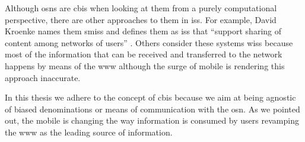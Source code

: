Although \acp{osn} are \ac{cbis} when looking at them from a purely computational 
perspective, there are other approaches to them in \acp{is}. For example, David 
Kroenke names them \acp{smis} and defines them as \acp{is} that ``support sharing 
of content among networks of users'' \cite{Kroenke15}. Others consider these systems 
\acp{wis} because most of the information that can be received and transferred to 
the network happens by means of the \ac{www} although the surge of mobile \Internet 
is rendering this approach inaccurate.

In this thesis we adhere to the concept of \ac{cbis} because we aim at being agnostic 
of biased denominations or means of communication with the \ac{osn}. As we pointed 
out, the mobile \Internet is changing the way information is consumed by users revamping 
the \ac{www} as the leading source of information.




%
%


